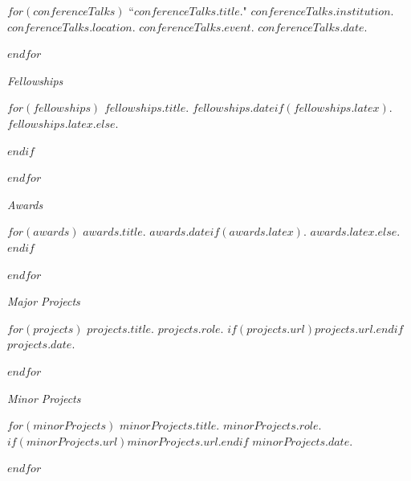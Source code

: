 \documentclass[11pt,article,oneside]{memoir}
\begin{document}
\smallskip

$for(conferenceTalks)$
\ind ``$conferenceTalks.title$." $conferenceTalks.institution$. $conferenceTalks.location$. \emph{$conferenceTalks.event$}. $conferenceTalks.date$. \normalsize

\smallskip
$endfor$
\medskip

\pagebreak[1]


\ind \emph{Fellowships}

\smallskip

$for(fellowships)$
\ind $fellowships.title$. $fellowships.date$$if(fellowships.latex)$. $fellowships.latex$.$else${.}

\smallskip
$endif$

$endfor$

\bigskip

\ind \emph{Awards}

\smallskip

$for(awards)$
\ind $awards.title$. $awards.date$$if(awards.latex)$. $awards.latex$.$else${.}$endif$

\smallskip
$endfor$

\bigskip


\ind \emph{Major Projects}

\smallskip

$for(projects)$
\ind \emph{$projects.title$}. $projects.role$. $if(projects.url)$\href{$projects.url$}{$projects.url$}.$endif$ $projects.date$.

\smallskip
$endfor$

\bigskip

\ind \emph{Minor Projects}

\smallskip

$for(minorProjects)$
\ind \emph{$minorProjects.title$}. $minorProjects.role$. $if(minorProjects.url)$\href{$minorProjects.url$}{$minorProjects.url$}.$endif$ $minorProjects.date$.

\smallskip
$endfor$

\bigskip
\pagebreak[1]

\thispagestyle{jtmcolophon}
\end{document}
